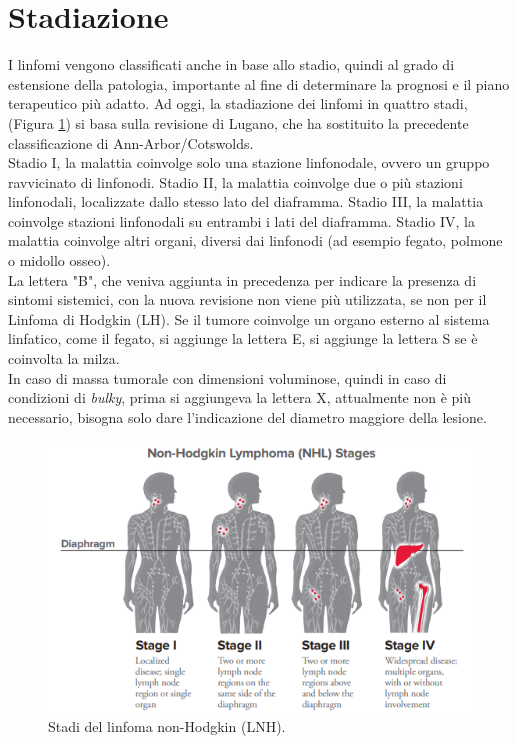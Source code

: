 \section{Stadiazione}
I linfomi vengono classificati anche in base allo stadio, quindi al grado di estensione della patologia, 
importante al fine di determinare la prognosi e il piano terapeutico più adatto. 
Ad oggi, la stadiazione dei linfomi in quattro stadi, (Figura \ref{fig:FIGURE_2.14}) si basa sulla revisione di 
Lugano, che ha sostituito la precedente classificazione di Ann-Arbor/Cotswolds\cite{AIOM}.\\
Stadio I, la malattia coinvolge solo una stazione linfonodale, ovvero un gruppo ravvicinato di linfonodi. 
Stadio II, la malattia coinvolge due o più stazioni linfonodali, localizzate dallo stesso lato del diaframma. 
Stadio III, la malattia coinvolge stazioni linfonodali su entrambi i lati del diaframma. 
Stadio IV, la malattia coinvolge altri organi, diversi dai linfonodi (ad esempio fegato, polmone o midollo osseo)\cite{LLS}.\\
La lettera "B", che veniva aggiunta in precedenza per indicare la presenza di sintomi sistemici, 
con la nuova revisione non viene più utilizzata, se non per il Linfoma di Hodgkin (LH)\cite{AIOM}.
Se il tumore coinvolge un organo esterno al sistema linfatico, come il fegato, si aggiunge la lettera E, 
si aggiunge la lettera S se è coinvolta la milza\cite{ISTGENT}.\\
In caso di massa tumorale con dimensioni voluminose, quindi in caso di condizioni di \emph{bulky}, 
prima si aggiungeva la lettera X, attualmente non è più necessario, 
bisogna solo dare l’indicazione del diametro maggiore della lesione\cite{AIOM}.

\begin{figure}[H]
    \begin{center}
    \includegraphics[width=0.7\columnwidth]{img/nhlstages.png}
    \vspace{-3mm}
    \end{center}
    \caption{Stadi del linfoma non-Hodgkin (LNH).
    \cite{LLS}}
    \label{fig:FIGURE_2.14}
\end{figure}

